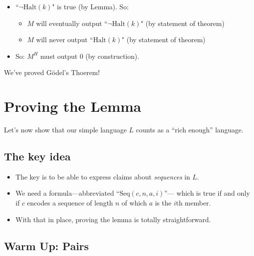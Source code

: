 \documentclass[12pt]{extarticle}
\begin{document}
{\begin{itemize}
\begin{itemize}
\item ``\(\neg \mbox{Halt}(k)\)" is true (by Lemma). So:


\begin{itemize}
\item  $M$ will eventually output ``\(\neg\mbox{Halt}(k)\)" (by statement of theorem)

\item $M$ will never output ``\(\mbox{Halt}(k)\)" (by statement of theorem)
\end{itemize}

\item So: $M^H$ must output 0 (by construction). 
\end{itemize}


\end{itemize}
}

\vspace{5mm}
We've proved G\"odel's Thoerem! 


\section{Proving the Lemma}

Let's now show that our simple language $L$ counts as a ``rich enough'' language.




\subsection{The key idea}

\begin{itemize}

\item The key is to be able to express claims about \emph{sequences} in \(L\). 

\item We need a formula---abbreviated ``$\mbox{Seq}(c,n,a,i)$''--- which is true if and only if \(c\) encodes a sequence of length \(n\) of which \(a\) is the \(i\)th member.  

\item With that in place, proving the lemma is totally straightforward.

\end{itemize}

\subsection{Warm Up: Pairs}
\end{document}
